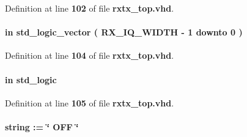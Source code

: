 Definition at line {\bf 102} of file {\bf rxtx\+\_\+top.\+vhd}.

\paragraph[{rx\+\_\+\+D\+IQ}]{ {\bfseries \textcolor{keywordflow}{in}\textcolor{vhdlchar}{ }} {\bfseries \textcolor{comment}{std\+\_\+logic\+\_\+vector}\textcolor{vhdlchar}{ }\textcolor{vhdlchar}{(}\textcolor{vhdlchar}{ }\textcolor{vhdlchar}{ }\textcolor{vhdlchar}{ }\textcolor{vhdlchar}{ }{\bfseries {\bf R\+X\+\_\+\+I\+Q\+\_\+\+W\+I\+D\+TH}} \textcolor{vhdlchar}{-\/}\textcolor{vhdlchar}{ } \textcolor{vhdldigit}{1} \textcolor{vhdlchar}{ }\textcolor{keywordflow}{downto}\textcolor{vhdlchar}{ }\textcolor{vhdlchar}{ } \textcolor{vhdldigit}{0} \textcolor{vhdlchar}{ }\textcolor{vhdlchar}{)}\textcolor{vhdlchar}{ }} \hspace{0.3cm}{\ttfamily [Port]}}\label{classrxtx__top_a80bff39ed361269e2a9916bf631007dd}


Definition at line {\bf 104} of file {\bf rxtx\+\_\+top.\+vhd}.

\paragraph[{rx\+\_\+fsync}]{ {\bfseries \textcolor{keywordflow}{in}\textcolor{vhdlchar}{ }} {\bfseries \textcolor{comment}{std\+\_\+logic}\textcolor{vhdlchar}{ }} \hspace{0.3cm}{\ttfamily [Port]}}\label{classrxtx__top_a557dbc2c4a99f68557b49d8393ffee65}


Definition at line {\bf 105} of file {\bf rxtx\+\_\+top.\+vhd}.

\paragraph[{R\+X\+\_\+\+I\+N\+V\+E\+R\+T\+\_\+\+I\+N\+P\+U\+T\+\_\+\+C\+L\+O\+C\+KS}]{ {\bfseries \textcolor{vhdlchar}{ }} {\bfseries \textcolor{comment}{string}\textcolor{vhdlchar}{ }\textcolor{vhdlchar}{ }\textcolor{vhdlchar}{\+:}\textcolor{vhdlchar}{=}\textcolor{vhdlchar}{ }\textcolor{vhdlchar}{ }\textcolor{vhdlchar}{ }\textcolor{vhdlchar}{ }\textcolor{keyword}{\char`\"{} O\+F\+F \char`\"{}}\textcolor{vhdlchar}{ }} \hspace{0.3cm}{\ttfamily [Generic]}}\label{classrxtx__top_a2cabb104a34419da6039f83174fa5929}


